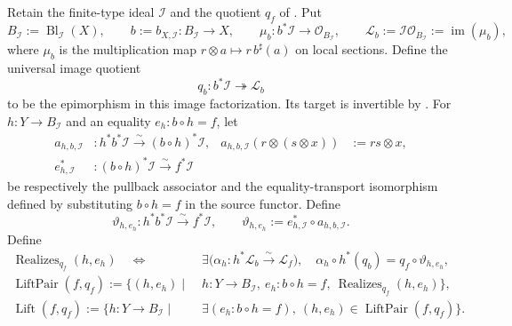 \begin{definition}
  \label{def:nagata-blowup-lift-set}

  Retain the finite-type ideal $\mathcal I$ and the quotient $q_f$ of
  .  Put
  \[
    B_{\mathcal I}:=\operatorname{Bl}_{\mathcal I}(X),
    \qquad b:=b_{X,\mathcal I}\colon B_{\mathcal I}\to X,
    \qquad
    \mu_b\colon b^*\mathcal I\longrightarrow\mathcal O_{B_{\mathcal I}},
    \qquad
    \mathcal L_b:=\mathcal I\mathcal O_{B_{\mathcal I}}
      :=\operatorname{im}(\mu_b),
  \]
  where $\mu_b$ is the multiplication map
  $r\otimes a\mapsto r\,b^\sharp(a)$ on local sections.
  Define the universal image quotient
  \[
    q_b\colon b^*\mathcal I\twoheadrightarrow\mathcal L_b
  \]
  to be the epimorphism in this image factorization.  Its target is
  invertible by .
  For $h\colon Y\to B_{\mathcal I}$ and an equality
  $e_h\colon b\circ h=f$, let
  \[
  \begin{aligned}
    a_{h,b,\mathcal I}&\colon h^*b^*\mathcal I
      \xrightarrow{\sim}(b\circ h)^*\mathcal I,
      &a_{h,b,\mathcal I}(r\otimes(s\otimes x))&:=rs\otimes x,\\
    e_{h,\mathcal I}^*&\colon(b\circ h)^*\mathcal I
      \xrightarrow{\sim}f^*\mathcal I
  \end{aligned}
  \]
  be respectively the pullback associator and the equality-transport
  isomorphism defined by substituting $b\circ h=f$ in the source functor.
  Define
  \[
    \vartheta_{h,e_h}\colon h^*b^*\mathcal I
      \xrightarrow{\sim}f^*\mathcal I,
    \qquad
    \vartheta_{h,e_h}:=e_{h,\mathcal I}^*\circ a_{h,b,\mathcal I}.
  \]
  Define
  \[
  \begin{aligned}
    \operatorname{Realizes}_{q_f}(h,e_h)
      \quad\Longleftrightarrow\quad
    &\exists\bigl(\alpha_h\colon
        h^*\mathcal L_b\xrightarrow{\sim}\mathcal L_f\bigr),\quad
      \alpha_h\circ h^*(q_b)
        =q_f\circ\vartheta_{h,e_h},\\
    \operatorname{LiftPair}(f,q_f)
      :=\{(h,e_h)\mid\;&h\colon Y\to B_{\mathcal I},\ 
        e_h\colon b\circ h=f,\
        \operatorname{Realizes}_{q_f}(h,e_h)\},\\
    \operatorname{Lift}(f,q_f)
      :=\{h\colon Y\to B_{\mathcal I}\mid\;&
        \exists(e_h\colon b\circ h=f),\ 
        (h,e_h)\in\operatorname{LiftPair}(f,q_f)\}.
  \end{aligned}
  \]
\end{definition}

